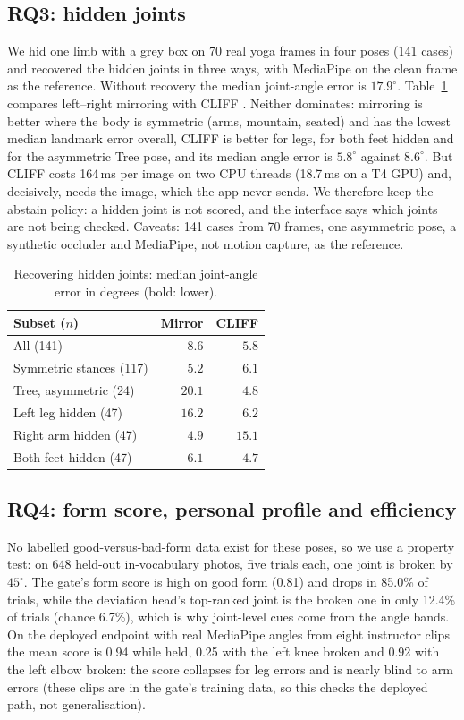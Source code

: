 \subsection{RQ3: hidden joints}\label{sec:rq3}
We hid one limb with a grey box on 70 real yoga frames in four poses (141 cases) and recovered the hidden joints in three ways, with MediaPipe on the clean frame as the reference. Without recovery the median joint-angle error is $17.9^\circ$. Table~\ref{tab:cliff} compares left--right mirroring with CLIFF \cite{li2022cliff}. Neither dominates: mirroring is better where the body is symmetric (arms, mountain, seated) and has the lowest median landmark error overall, CLIFF is better for legs, for both feet hidden and for the asymmetric Tree pose, and its median angle error is $5.8^\circ$ against $8.6^\circ$. But CLIFF costs 164\,ms per image on two CPU threads (18.7\,ms on a T4 GPU) and, decisively, needs the image, which the app never sends. We therefore keep the abstain policy: a hidden joint is not scored, and the interface says which joints are not being checked. Caveats: 141 cases from 70 frames, one asymmetric pose, a synthetic occluder and MediaPipe, not motion capture, as the reference.
\begin{table}[t]
\centering\footnotesize
\caption{Recovering hidden joints: median joint-angle error in degrees (bold: lower).}\label{tab:cliff}
\begin{tabular}{@{}lrr@{}}
\toprule
Subset ($n$) & Mirror & CLIFF \\ \midrule
All (141) & $8.6$ & $\mathbf{5.8}$ \\
Symmetric stances (117) & $\mathbf{5.2}$ & $6.1$ \\
Tree, asymmetric (24) & $20.1$ & $\mathbf{4.8}$ \\
Left leg hidden (47) & $16.2$ & $\mathbf{6.2}$ \\
Right arm hidden (47) & $\mathbf{4.9}$ & $15.1$ \\
Both feet hidden (47) & $6.1$ & $\mathbf{4.7}$ \\ \bottomrule
\end{tabular}
\end{table}

\subsection{RQ4: form score, personal profile and efficiency}\label{sec:form}
 No labelled good-versus-bad-form data exist for these poses, so we use a property test: on 648 held-out in-vocabulary photos, five trials each, one joint is broken by $45^\circ$. The gate's form score is high on good form (0.81) and drops in 85.0\% of trials, while the deviation head's top-ranked joint is the broken one in only 12.4\% of trials (chance 6.7\%), which is why joint-level cues come from the angle bands. On the deployed endpoint with real MediaPipe angles from eight instructor clips the mean score is 0.94 while held, 0.25 with the left knee broken and 0.92 with the left elbow broken: the score collapses for leg errors and is nearly blind to arm errors (these clips are in the gate's training data, so this checks the deployed path, not generalisation).

